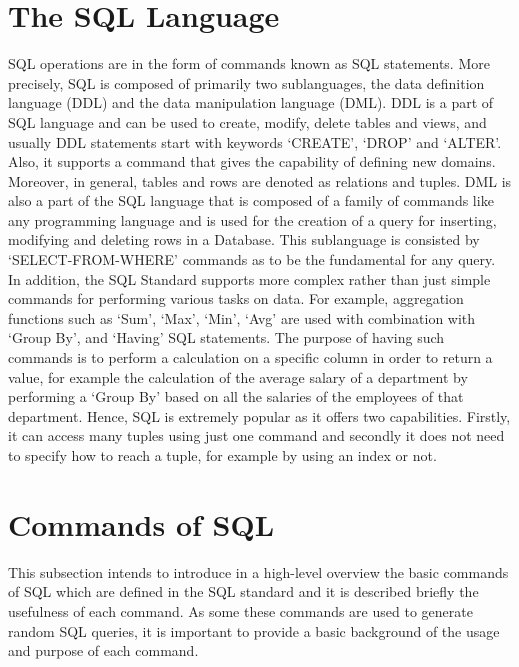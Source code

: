 \section{The SQL Language}
SQL operations are in the form of commands known as SQL statements. More precisely, SQL is composed of primarily two sublanguages, the data definition language (DDL) and the data manipulation language (DML). DDL is a part of SQL language and can be used to create, modify, delete tables and views, and usually DDL statements start with keywords ‘CREATE’, ‘DROP’ and ‘ALTER’. Also, it supports a command that gives the capability of defining new domains. Moreover, in general, tables and rows are denoted as relations and tuples. DML is also a part of the SQL language that is composed of a family of commands like any programming language and is used for the creation of a query for inserting, modifying and deleting rows in a Database. This sublanguage is consisted by ‘SELECT-FROM-WHERE’ commands as to be the fundamental for any query. In addition, the SQL Standard supports more complex rather than just simple commands for performing various tasks on data. For example, aggregation functions such as ‘Sum’, ‘Max’, ‘Min’, ‘Avg’ are used with combination with ‘Group By’, and ‘Having’ SQL statements. The purpose of having such commands is to perform a calculation on a specific column in order to return a value, for example the calculation of the average salary of a department by performing a ‘Group By’ based on all the salaries of the employees of that department. 
Hence, SQL is extremely popular as it offers two capabilities. Firstly, it can access many tuples using just one command and secondly it does not need to specify how to reach a tuple, for example by using an index or not. 


\section{Commands of SQL}
This subsection intends to introduce in a high-level overview the basic commands of SQL which are defined in the SQL standard and it is described briefly the usefulness of each command. As some these commands are used to generate random SQL queries, it is important to provide a basic background of the usage and purpose of each command. 

